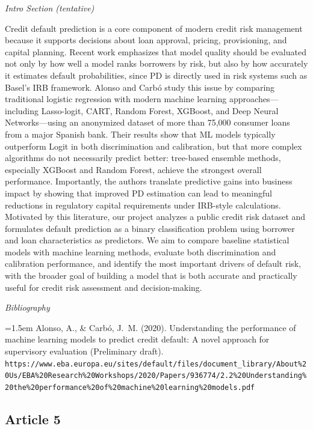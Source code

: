 \documentclass[letterpaper]{article}
\begin{document}
	\medskip
	
	\textit{Intro Section (tentative)}
	
	Credit default prediction is a core component of modern credit risk management because it supports decisions about loan approval, pricing, provisioning, and capital planning. Recent work emphasizes that model quality should be evaluated not only by how well a model ranks borrowers by risk, but also by how accurately it estimates default probabilities, since PD is directly used in risk systems such as Basel's IRB framework. Alonso and Carb\'{o} study this issue by comparing traditional logistic regression with modern machine learning approaches---including Lasso-logit, CART, Random Forest, XGBoost, and Deep Neural Networks---using an anonymized dataset of more than 75,000 consumer loans from a major Spanish bank. Their results show that ML models typically outperform Logit in both discrimination and calibration, but that more complex algorithms do not necessarily predict better: tree-based ensemble methods, especially XGBoost and Random Forest, achieve the strongest overall performance. Importantly, the authors translate predictive gains into business impact by showing that improved PD estimation can lead to meaningful reductions in regulatory capital requirements under IRB-style calculations. Motivated by this literature, our project analyzes a public credit risk dataset and formulates default prediction as a binary classification problem using borrower and loan characteristics as predictors. We aim to compare baseline statistical models with machine learning methods, evaluate both discrimination and calibration performance, and identify the most important drivers of default risk, with the broader goal of building a model that is both accurate and practically useful for credit risk assessment and decision-making.
	
	\medskip
	
	\textit{Bibliography}
	
	\hangindent=1.5em
	Alonso, A., \& Carb\'{o}, J.~M. (2020). Understanding the performance of machine learning models to predict credit default: A novel approach for supervisory evaluation (Preliminary draft). \texttt{https://www.eba.europa.eu/sites/default/files/document\_library/About\%20Us/EBA\%20Research\%20Workshops/2020/Papers/936774/2.2\%20Understanding\%20the\%20performance\%20of\%20machine\%20learning\%20models.pdf}
	
	\subsection{Article 5}
	
\end{document}
